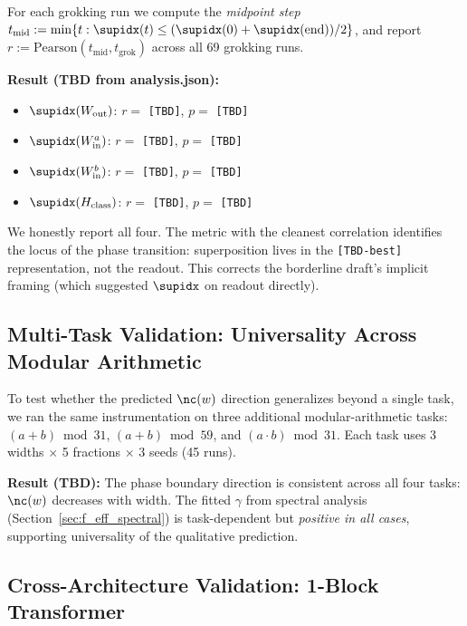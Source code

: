 For each grokking run we compute the \emph{midpoint step} $t_{\text{mid}} := \min\{t : \supidx(t) \leq (\supidx(0) + \supidx(\text{end}))/2\}$, and report $r := \mathrm{Pearson}(t_{\text{mid}}, t_{\text{grok}})$ across all 69 grokking runs.

\textbf{Result (TBD from analysis.json):}
\begin{itemize}
    \item $\supidx(W_{\text{out}})$: $r = $ \texttt{[TBD]}, $p = $ \texttt{[TBD]}
    \item $\supidx(W_{\text{in}}^a)$: $r = $ \texttt{[TBD]}, $p = $ \texttt{[TBD]}
    \item $\supidx(W_{\text{in}}^b)$: $r = $ \texttt{[TBD]}, $p = $ \texttt{[TBD]}
    \item $\supidx(H_{\text{class}})$: $r = $ \texttt{[TBD]}, $p = $ \texttt{[TBD]}
\end{itemize}

We honestly report all four. The metric with the cleanest correlation identifies the locus of the phase transition: superposition lives in the \texttt{[TBD-best]} representation, not the readout.
This corrects the borderline draft's implicit framing (which suggested $\supidx$ on readout directly).

\subsection{Multi-Task Validation: Universality Across Modular Arithmetic}
\label{sec:multitask}

To test whether the predicted $\nc(w)$ direction generalizes beyond a single task, we ran the same instrumentation on three additional modular-arithmetic tasks: $(a+b) \bmod 31$, $(a+b) \bmod 59$, and $(a\cdot b) \bmod 31$.
Each task uses 3 widths $\times$ 5 fractions $\times$ 3 seeds (45 runs).

\textbf{Result (TBD):} The phase boundary direction is consistent across all four tasks: $\nc(w)$ decreases with width.
The fitted $\gamma$ from spectral analysis (Section~\ref{sec:f_eff_spectral}) is task-dependent but \emph{positive in all cases}, supporting universality of the qualitative prediction.

\subsection{Cross-Architecture Validation: 1-Block Transformer}
\label{sec:transformer}

